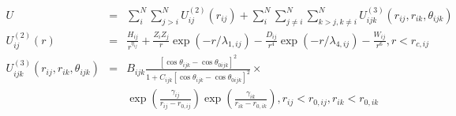 \documentclass[12pt]{article}
\begin{document}
\begin{eqnarray*}
  U & = & \sum_i^N \sum_{j > i}^N U_{ij}^{(2)} (r_{ij}) + 
          \sum_i^N \sum_{j \neq i}^N \sum_{k > j, k \neq i}^N 
          U_{ijk}^{(3)} (r_{ij}, r_{ik}, \theta_{ijk}) 
          \\
  U_{ij}^{(2)} (r) & = &  \frac{H_{ij}}{r^{\eta_{ij}}}
  	                        + \frac{Z_i Z_j}{r}\exp(-r/\lambda_{1,ij})
  	                        - \frac{D_{ij}}{r^4}\exp(-r/\lambda_{4,ij})
	                        - \frac{W_{ij}}{r^6}, r < r_{c,{ij}}
                   \\
  U_{ijk}^{(3)}(r_{ij},r_{ik},\theta_{ijk}) & = & B_{ijk} 
                    \frac{\left[ \cos \theta_{ijk} - \cos \theta_{0ijk} \right]^2}
                    {1+C_{ijk}\left[ \cos \theta_{ijk} - \cos \theta_{0ijk} \right]^2} \times \\
&  &                     \exp \left( \frac{\gamma_{ij}}{r_{ij} - r_{0,ij}} \right)
                    \exp \left( \frac{\gamma_{ik}}{r_{ik} - r_{0,ik}} \right), r_{ij} < r_{0,ij}, r_{ik} < r_{0,ik}
\end{eqnarray*}                           
\end{document}
